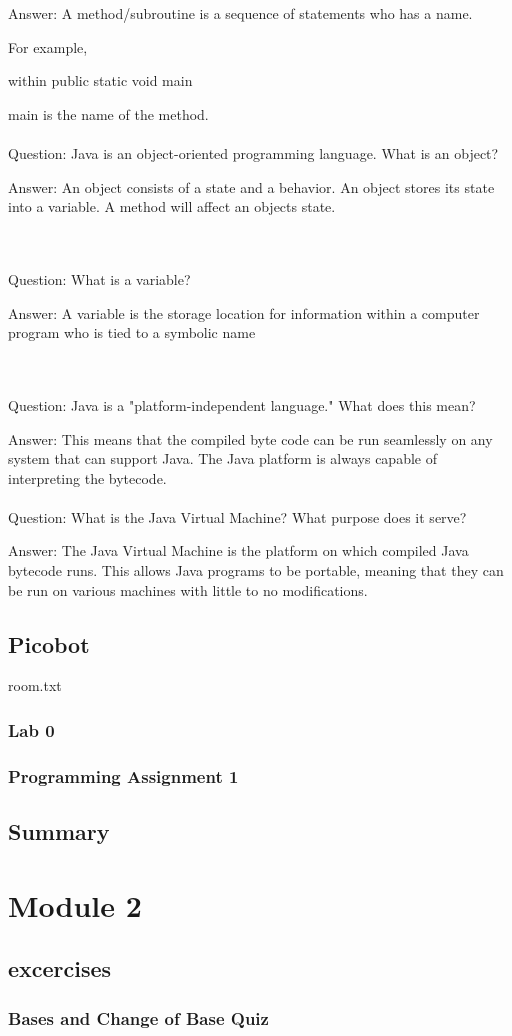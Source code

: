 \documentclass{article}
\begin{document}
Answer: A method/subroutine is a sequence of statements who has a name. 

For example,

within public static void main

main is the name of the method.
\\
\\
Question: Java is an object-oriented programming language. What is an object?

Answer: An object consists of a state and a behavior. An object stores its state into a variable. A method will affect an objects state.

\\
\\
Question: What is a variable?

Answer: A variable is the storage location for information within a computer program who is tied to a symbolic name

\\
\\
Question: Java is a "platform-independent language." What does this mean?

Answer: This means that the compiled byte code can be run seamlessly on any system that can support Java. The Java platform is always capable of interpreting the bytecode.
\\
\\
Question: What is the Java Virtual Machine?  What purpose does it serve?

Answer: The Java Virtual Machine is the platform on which compiled Java bytecode runs. This allows Java programs to be portable, meaning that they can be run on various machines with little to no modifications.

\subsection{Picobot}

room.txt

\subsubsection{Lab 0}

\subsubsection{Programming Assignment 1}

\subsection{Summary}

\section{Module 2}

\subsection{excercises}

\subsubsection{Bases and Change of Base Quiz}



\printbibliography
\end{document}
